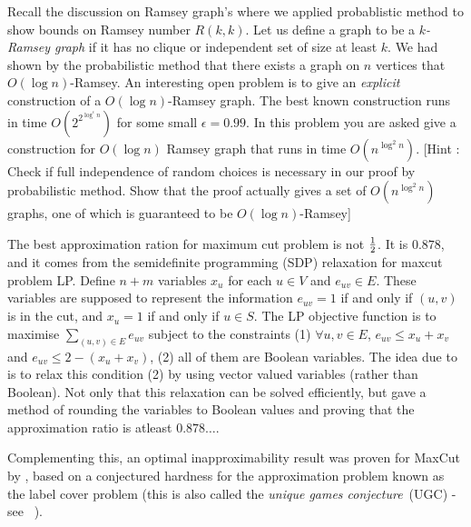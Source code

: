 \begin{exercise}
Recall the discussion on Ramsey graph's where we applied probablistic method to show bounds on Ramsey number $R(k,k)$. Let us define a graph to be a \textit{$k$-Ramsey graph} if it has no clique or independent set of size at least $k$. We had shown by the probabilistic method that there exists a graph on $n$ vertices that $O(\log n)$-Ramsey. An interesting open problem is to give an \textit{explicit} construction of a $O(\log n)$-Ramsey graph. The best known construction runs in time $O(2^{2^{\log^\epsilon n}})$ for some small $\epsilon=0.99$. In this problem you are asked give a construction for $O(\log n)$ Ramsey graph that runs in time $O(n^{\log^2 n})$. [Hint : Check if full independence of random choices is necessary in our proof by probabilistic method. Show that the proof actually gives a set of $O(n^{\log^2 n})$ graphs, one of which is guaranteed to be $O(\log n)$-Ramsey]
\end{exercise}

\begin{curiousity}
The best approximation ration for maximum cut problem is not $\frac{1}{2}$. It is $0.878$, and it comes from the semidefinite programming (SDP) relaxation for maxcut problem LP. Define $n+m$ variables $x_u$ for each $u \in V$ and $e_{uv} \in E$. These variables are supposed to represent the information $e_{uv} = 1$ if and only if $(u,v)$ is in the cut, and $x_u = 1$ if and only if $u \in S$. The LP objective function is to maximise $\sum_{(u,v) \in E} e_{uv}$ subject to the constraints (1) $\forall u,v \in E$, $e_{uv} \le x_u+x_v$ and $e_{uv} \le 2-(x_u+x_v)$, (2) all of them are Boolean variables. The idea due to \cite{GW95} is to relax this condition (2) by using vector valued variables (rather than Boolean). Not only that this relaxation can be solved efficiently, but \cite{GW95} gave a method of rounding the variables to Boolean values and proving that the approximation ratio is atleast $0.878 \ldots$.

Complementing this, an optimal inapproximability result was proven for {\sc MaxCut} by \cite{Kho07}, based on a conjectured hardness for the approximation problem known as the label cover problem (this is also called the {\em unique games conjecture}~(UGC) - see ~\cite{Kho10}).
\end{curiousity}


